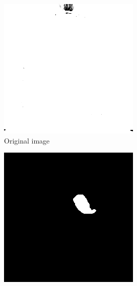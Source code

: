 \begin{figure}
  \centering
  \begin{subfigure}[t]{.32\textwidth}
    \centering
    \includegraphics[width=\textwidth]{images/IMG_example.png}
    \caption{Original image}
  \end{subfigure}
  \hfill
  \begin{subfigure}[t]{.32\textwidth}
    \centering
    \includegraphics[width=\textwidth]{images/IMG_MASS_example.png}

\end{subfigure}
\end{figure}
